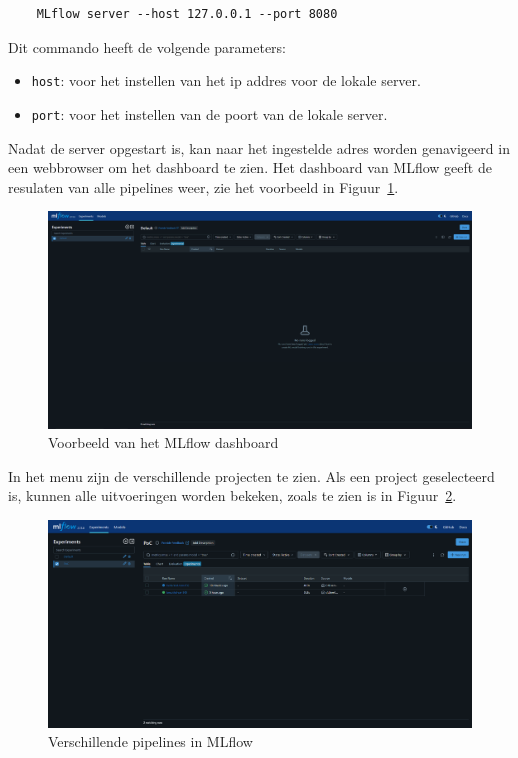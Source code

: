 \begin{verbatim}
    MLflow server --host 127.0.0.1 --port 8080
\end{verbatim}

Dit commando heeft de volgende parameters:

\begin{itemize}
    \item \texttt{host}: voor het instellen van het ip addres voor de lokale server.
    \item \texttt{port}: voor het instellen van de poort van de lokale server.
\end{itemize}

Nadat de server opgestart is, kan naar het ingestelde adres worden genavigeerd in een webbrowser om het dashboard te zien. Het dashboard van MLflow geeft de resulaten van alle pipelines weer, zie het voorbeeld in Figuur~\ref{fig:MLflow_dashboard}.

\begin{figure}[h]
    \centering
    \includegraphics[width=0.9\linewidth]{graphics/MLflow_dashboard.PNG}
    \caption{Voorbeeld van het MLflow dashboard}
    \label{fig:MLflow_dashboard}
\end{figure}

In het menu zijn de verschillende projecten te zien. Als een project geselecteerd is, kunnen alle uitvoeringen worden bekeken, zoals te zien is in Figuur~\ref{fig:MLflow_runs}.

\begin{figure}[h]
    \centering
    \includegraphics[width=0.9\linewidth]{graphics/MLflow_Runs.PNG}
    \caption{Verschillende pipelines in MLflow}
    \label{fig:MLflow_runs}
\end{figure}

